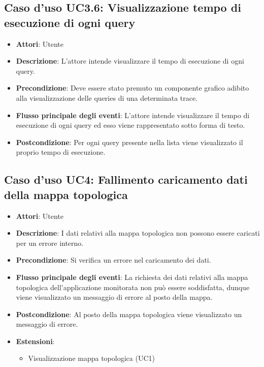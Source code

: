 \subsection{Caso d'uso UC3.6: Visualizzazione tempo di esecuzione di ogni query}
\begin{itemize}
\item \textbf{Attori}: Utente
\item \textbf{Descrizione}: L'attore intende visualizzare il tempo di esecuzione di ogni query.
\item \textbf{Precondizione}: Deve essere stato premuto un componente grafico adibito alla visualizzazione delle queries di una determinata trace.
\item \textbf{Flusso principale degli eventi}: L'attore intende visualizzare il tempo di esecuzione di ogni query ed esso viene rappresentato sotto forma di testo.
\item \textbf{Postcondizione}: Per ogni query presente nella lista viene visualizzato il proprio tempo di esecuzione.
\end{itemize}
\subsection{Caso d'uso UC4: Fallimento caricamento dati della mappa topologica}
\begin{itemize}
\item \textbf{Attori}: Utente
\item \textbf{Descrizione}: I dati relativi alla mappa topologica non possono essere caricati per un errore interno.
\item \textbf{Precondizione}: Si verifica un errore nel caricamento dei dati.
\item \textbf{Flusso principale degli eventi}: La richiesta dei dati relativi alla mappa topologica dell'applicazione monitorata non può essere soddisfatta, dunque viene visualizzato un messaggio di errore al posto della mappa.
\item \textbf{Postcondizione}: Al posto della mappa topologica viene visualizzato un messaggio di errore.
\item \textbf{Estensioni}:
\begin{itemize}
\item Visualizzazione mappa topologica (UC1)
\end{itemize}
\end{itemize}
